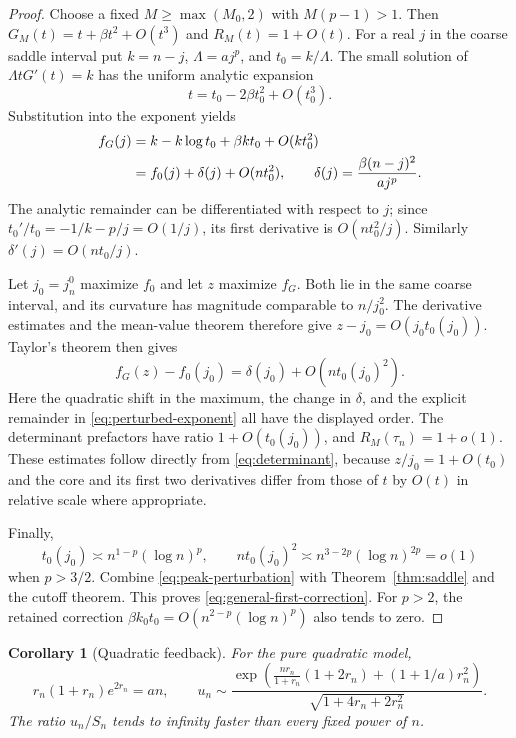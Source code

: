 \documentclass[11pt,a4paper]{article}
\numberwithin{equation}{section}
\newtheorem{corollary}[theorem]{Corollary}
\theoremstyle{definition}
\theoremstyle{remark}
\begin{document}
\begin{proof}
Choose a fixed $M\ge\max(M_0,2)$ with $M(p-1)>1$. Then
$G_M(t)=t+\beta t^2+O(t^3)$ and $R_M(t)=1+O(t)$.
For a real $j$ in the coarse saddle interval put
$k=n-j$, $\Lambda=a j^p$, and $t_0=k/\Lambda$. The small solution of
$\Lambda tG'(t)=k$ has the uniform analytic expansion
\[
 t=t_0-2\beta t_0^2+O(t_0^3).
\]
Substitution into the exponent yields
\begin{align}
 f_G(j)
 &=k-k\log t_0+\beta k t_0+O(k t_0^2)\notag\\
 &=f_0(j)+\delta(j)+O(n t_0^2),
 \qquad\delta(j)=\frac{\beta(n-j)^2}{a j^p}.
 \label{eq:perturbed-exponent}
\end{align}
The analytic remainder can be differentiated with respect to $j$;
since $t_0'/t_0=-1/k-p/j=O(1/j)$, its first derivative is
$O(n t_0^2/j)$. Similarly $\delta'(j)=O(n t_0/j)$.

Let $j_0=j_n^0$ maximize $f_0$ and let $z$ maximize $f_G$.
Both lie in the same coarse interval, and its curvature has magnitude
comparable to $n/j_0^2$. The derivative estimates and the mean-value theorem
therefore give $z-j_0=O(j_0 t_0(j_0))$. Taylor's theorem then gives
\begin{equation}
 f_G(z)-f_0(j_0)=\delta(j_0)+O(n t_0(j_0)^2).
 \label{eq:peak-perturbation}
\end{equation}
Here the quadratic shift in the maximum, the change in $\delta$, and the
explicit remainder in \eqref{eq:perturbed-exponent} all have the displayed
order. The determinant prefactors have ratio $1+O(t_0(j_0))$, and
$R_M(\tau_n)=1+o(1)$. These estimates follow directly from
\eqref{eq:determinant}, because $z/j_0=1+O(t_0)$ and the core
and its first two derivatives differ from those of $t$ by $O(t)$ in
relative scale where appropriate.

Finally,
\[
 t_0(j_0)\asymp n^{1-p}(\log n)^p,\qquad
 n t_0(j_0)^2\asymp n^{3-2p}(\log n)^{2p}=o(1)
\]
when $p>3/2$. Combine \eqref{eq:peak-perturbation} with
Theorem~\ref{thm:saddle} and the cutoff theorem. This proves
\eqref{eq:general-first-correction}. For $p>2$, the retained correction
$\beta k_0t_0=O(n^{2-p}(\log n)^p)$ also tends to zero.
\end{proof}

\begin{corollary}[Quadratic feedback]
For the pure quadratic model,
\begin{equation}
 r_n(1+r_n)e^{2r_n}=an,
 \qquad
 u_n\sim
 \frac{\exp\!\left(\frac{nr_n}{1+r_n}(1+2r_n)
                      +(1+1/a)r_n^2\right)}
      {\sqrt{1+4r_n+2r_n^2}}.
 \label{eq:quadratic-full}
\end{equation}
The ratio $u_n/S_n$ tends to infinity faster than every fixed power of $n$.
\end{corollary}
\end{document}
